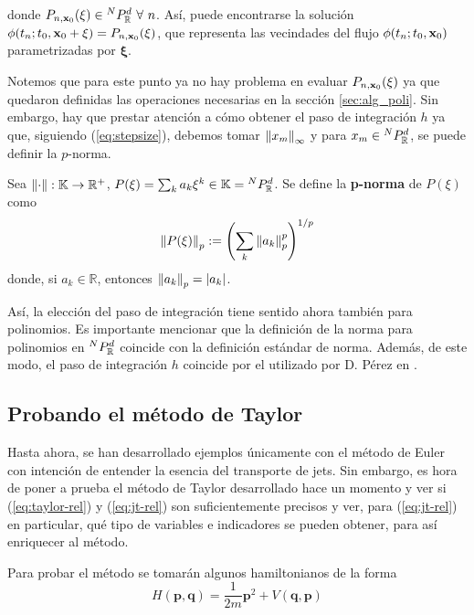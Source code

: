 donde $P_{n,\xo}(\xi) \in \pkk{N}{d} \ \forall \ n$. Así, puede encontrarse la solución $\phi(t_n;t_0,\mathbf{x}_0 + \mathbf{\xi}) = P_{n,\mathbf{x}_0}(\xi)$, que representa las vecindades del flujo $\phi(t_n;t_0,\mathbf{x}_0)$ parametrizadas por $\mathbf{\xi}$.

Notemos que para este punto ya no hay problema en evaluar $P_{n,\mathbf{x}_0}(\xi)$ ya que quedaron definidas las operaciones necesarias en la sección \ref{sec:alg_poli}. Sin embargo, hay que prestar atención a cómo obtener el paso de integración $h$ ya que, siguiendo (\ref{eq:stepsize}), debemos tomar $\left\lVert x_m\right\rVert_\infty$ y para $x_m \in {^{N}P_{\mathbb{R}}^ d }$, se puede definir la $p$-norma.

\begin{definicion}
Sea $\left\lVert\cdot\right\rVert : \mathbb{K} \to \mathbb{R}^+$, $P(\mathbf{\xi}) = \sum_{k} a_k \mathbf{\xi}^k \in \mathbb{K} = {^{N}P_{\mathbb{R}}^ d }$. Se define la \textbf{p-norma} de $P(\xi)$ como
\begin{equation}
 \left\lVert P(\mathbf{\xi})\right\rVert_p := \left( \sum_{k} \left\lVert a_k\right\rVert_p^p \right)^{1/p}
 \label{eq:poly-norm}
\end{equation}  
donde, si $a_k \in \mathbb{R}$, entonces $\left\lVert a_k\right\rVert_p = |a_k|$.
\end{definicion}

Así, la elección del paso de integración tiene sentido ahora también para polinomios. Es importante mencionar que la definición de la norma para polinomios en ${^{N}P_{\mathbb{R}}^ d }$ coincide con la definición estándar de norma. Además, de este modo, el paso de integración $h$ coincide por el utilizado por D. Pérez en \cite{Daniel2015}.

\subsection{Probando el método de Taylor}
\label{sec:benchmark-taylor}

Hasta ahora, se han desarrollado ejemplos únicamente con el método de Euler con intención de entender la esencia del transporte de jets. Sin embargo, es hora de poner a prueba el método de Taylor desarrollado hace un momento y ver si (\ref{eq:taylor-rel}) y (\ref{eq:jt-rel}) son suficientemente precisos y ver, para (\ref{eq:jt-rel}) en particular, qué tipo de variables e indicadores se pueden obtener, para así enriquecer al método.

Para probar el método se tomarán algunos hamiltonianos de la forma
\begin{equation}
 H(\mathbf{p},\mathbf{q}) = \frac{1}{2m}\mathbf{p}^2 + V(\mathbf{q},\mathbf{p})
 \label{eq:hamiltonian}
\end{equation}


